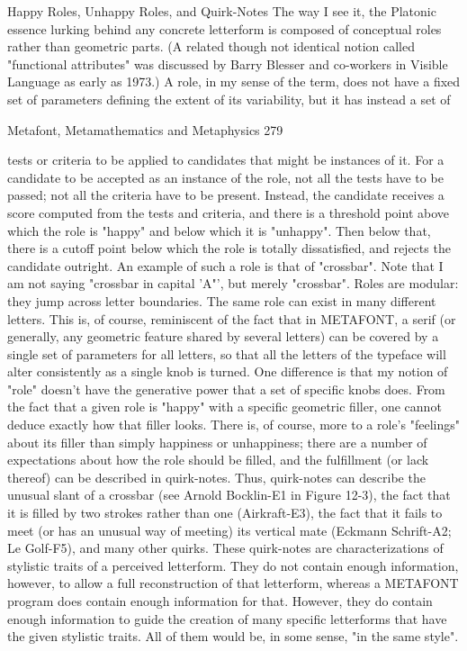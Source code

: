                 Happy Roles, Unhappy Roles, and Quirk-Notes
        The way I see it, the Platonic essence lurking behind any concrete letterform is
composed of conceptual roles rather than geometric parts. (A related though not identical
notion called "functional attributes" was discussed by Barry Blesser and co-workers in
Visible Language as early as 1973.) A role, in my sense of the term, does not have a fixed
set of parameters defining the extent of its variability, but it has instead a set of




Metafont, Metamathematics and Metaphysics                                                 279

tests or criteria to be applied to candidates that might be instances of it. For a candidate to
be accepted as an instance of the role, not all the tests have to be passed; not all the
criteria have to be present. Instead, the candidate receives a score computed from the tests
and criteria, and there is a threshold point above which the role is "happy" and below
which it is "unhappy". Then below that, there is a cutoff point below which the role is
totally dissatisfied, and rejects the candidate outright.
         An example of such a role is that of "crossbar". Note that I am not saying
"crossbar in capital 'A"', but merely "crossbar". Roles are modular: they jump across
letter boundaries. The same role can exist in many different letters. This is, of course,
reminiscent of the fact that in METAFONT, a serif (or generally, any geometric feature
shared by several letters) can be covered by a single set of parameters for all letters, so
that all the letters of the typeface will alter consistently as a single knob is turned. One
difference is that my notion of "role" doesn't have the generative power that a set of
specific knobs does. From the fact that a given role is "happy" with a specific geometric
filler, one cannot deduce exactly how that filler looks. There is, of course, more to a role's
"feelings" about its filler than simply happiness or unhappiness; there are a number of
expectations about how the role should be filled, and the fulfillment (or lack thereof) can
be described in quirk-notes. Thus, quirk-notes can describe the unusual slant of a crossbar
(see Arnold Bocklin-E1 in Figure 12-3), the fact that it is filled by two strokes rather than
one (Airkraft-E3), the fact that it fails to meet (or has an unusual way of meeting) its
vertical mate (Eckmann Schrift-A2; Le Golf-F5), and many other quirks.
         These quirk-notes are characterizations of stylistic traits of a perceived letterform.
They do not contain enough information, however, to allow a full reconstruction of that
letterform, whereas a METAFONT program does contain enough information for that.
However, they do contain enough information to guide the creation of many specific
letterforms that have the given stylistic traits. All of them would be, in some sense, "in
the same style".

